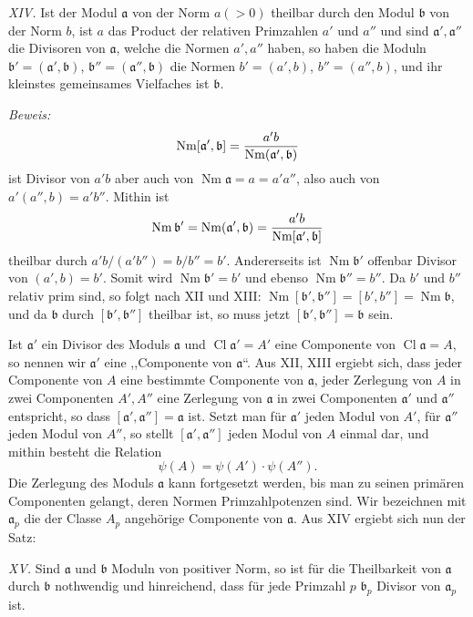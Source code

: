 \documentclass[11pt,a4paper]{article}
\newcommand{\Cl}{\operatorname{Cl}}
\newcommand{\Nm}{\operatorname{Nm}}
\begin{document}
\emph{XIV.} Ist der Modul $\mathfrak a$ von der Norm $a(>0)$ theilbar durch den Modul $\mathfrak b$ von der Norm $b$, ist $a$ das Product der relativen Primzahlen $a'$ und $a''$ und sind $\mathfrak a',\mathfrak a''$ die Divisoren von $\mathfrak a$, welche die Normen $a',a''$ haben, so haben die Moduln $\mathfrak b'=(\mathfrak a',\mathfrak b)$, $\mathfrak b''=(\mathfrak a'',\mathfrak b)$ die Normen $b'=(a',b)$, $b''=(a'',b)$, und ihr kleinstes gemeinsames Vielfaches ist $\mathfrak b$.

\emph{Beweis:}
\[
 \Nm[\mathfrak a',\mathfrak b]
 ={a'b\over \Nm(\mathfrak a',\mathfrak b)}
\]
ist Divisor von $a'b$ aber auch von $\Nm\mathfrak a=a=a'a''$, also auch von $a'(a'',b)=a'b''$. Mithin ist
\[
 \Nm\mathfrak b'=\Nm(\mathfrak a',\mathfrak b)
 ={a'b\over \Nm[\mathfrak a',\mathfrak b]}
\]
theilbar durch $a'b/(a'b'')=b/b''=b'$. Andererseits ist $\Nm\mathfrak b'$ offenbar Divisor von $(a',b)=b'$. Somit wird $\Nm\mathfrak b'=b'$ und ebenso $\Nm\mathfrak b''=b''$. Da $b'$ und $b''$ relativ prim sind, so folgt nach XII und XIII: $\Nm[\mathfrak b',\mathfrak b'']=[b',b'']=\Nm\mathfrak b$, und da $\mathfrak b$ durch $[\mathfrak b',\mathfrak b'']$ theilbar ist, so muss jetzt $[\mathfrak b',\mathfrak b'']=\mathfrak b$ sein.

Ist $\mathfrak a'$ ein Divisor des Moduls $\mathfrak a$ und $\Cl\mathfrak a'=A'$ eine Componente von $\Cl\mathfrak a=A$, so nennen wir $\mathfrak a'$ eine ,,Componente von $\mathfrak a$``. Aus XII, XIII ergiebt sich, dass jeder Componente von $A$ eine bestimmte Componente von $\mathfrak a$, jeder Zerlegung von $A$ in zwei Componenten $A',A''$ eine Zerlegung von $\mathfrak a$ in zwei Componenten $\mathfrak a'$ und $\mathfrak a''$ entspricht, so dass $[\mathfrak a',\mathfrak a'']=\mathfrak a$ ist. Setzt man für $\mathfrak a'$ jeden Modul von $A'$, für $\mathfrak a''$ jeden Modul von $A''$, so stellt $[\mathfrak a',\mathfrak a'']$ jeden Modul von $A$ einmal dar, und mithin besteht die Relation
\begin{equation}
 \psi(A)=\psi(A')\cdot\psi(A'').
\tag{5}
\end{equation}
Die Zerlegung des Moduls $\mathfrak a$ kann fortgesetzt werden, bis man zu seinen primären Componenten gelangt, deren Normen Primzahlpotenzen sind. Wir bezeichnen mit $\mathfrak a_p$ die der Classe $A_p$ angehörige Componente von $\mathfrak a$. Aus XIV ergiebt sich nun der Satz:

\emph{XV.} Sind $\mathfrak a$ und $\mathfrak b$ Moduln von positiver Norm, so ist für die Theilbarkeit von $\mathfrak a$ durch $\mathfrak b$ nothwendig und hinreichend, dass für jede Primzahl $p$ $\mathfrak b_p$ Divisor von $\mathfrak a_p$ ist.
\end{document}
